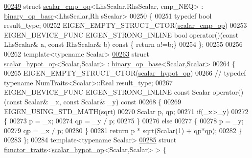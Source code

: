\begin{DoxyCode}
\hyperlink{struct_eigen_1_1internal_1_1scalar__cmp__op_3_01_lhs_scalar_00_01_rhs_scalar_00_01cmp___n_e_q_01_4}{00249} \textcolor{keyword}{struct }\hyperlink{struct_eigen_1_1internal_1_1scalar__cmp__op}{scalar\_cmp\_op}<LhsScalar,RhsScalar, cmp\_NEQ> : \hyperlink{struct_eigen_1_1internal_1_1binary__op__base}{binary\_op\_base}<LhsScalar,Rh
      sScalar>
00250 \{
00251   \textcolor{keyword}{typedef} \textcolor{keywordtype}{bool} result\_type;
00252   EIGEN\_EMPTY\_STRUCT\_CTOR(\hyperlink{struct_eigen_1_1internal_1_1scalar__cmp__op}{scalar\_cmp\_op})
00253   EIGEN\_DEVICE\_FUNC EIGEN\_STRONG\_INLINE \textcolor{keywordtype}{bool} operator()(\textcolor{keyword}{const} LhsScalar& a, \textcolor{keyword}{const} RhsScalar& b)\textcolor{keyword}{ const }\{\textcolor{keywordflow}{
      return} a!=b;\}
00254 \};
00255 
00256 
00262 \textcolor{keyword}{template}<\textcolor{keyword}{typename} Scalar>
\hyperlink{struct_eigen_1_1internal_1_1scalar__hypot__op_3_01_scalar_00_01_scalar_01_4}{00263} \textcolor{keyword}{struct }\hyperlink{struct_eigen_1_1internal_1_1scalar__hypot__op}{scalar\_hypot\_op}<Scalar,Scalar> : \hyperlink{struct_eigen_1_1internal_1_1binary__op__base}{binary\_op\_base}<Scalar,Scalar>
00264 \{
00265   EIGEN\_EMPTY\_STRUCT\_CTOR(\hyperlink{struct_eigen_1_1internal_1_1scalar__hypot__op}{scalar\_hypot\_op})
00266 \textcolor{comment}{//   typedef typename NumTraits<Scalar>::Real result\_type;}
00267   EIGEN\_DEVICE\_FUNC EIGEN\_STRONG\_INLINE \textcolor{keyword}{const} Scalar operator() (\textcolor{keyword}{const} Scalar& \_x, \textcolor{keyword}{const} Scalar& \_y)\textcolor{keyword}{ const}
00268 \textcolor{keyword}{  }\{
00269     EIGEN\_USING\_STD\_MATH(sqrt)
00270     Scalar p, qp;
00271     \textcolor{keywordflow}{if}(\_x>\_y)
00272     \{
00273       p = \_x;
00274       qp = \_y / p;
00275     \}
00276     \textcolor{keywordflow}{else}
00277     \{
00278       p = \_y;
00279       qp = \_x / p;
00280     \}
00281     \textcolor{keywordflow}{return} p * sqrt(Scalar(1) + qp*qp);
00282   \}
00283 \};
00284 \textcolor{keyword}{template}<\textcolor{keyword}{typename} Scalar>
\hyperlink{struct_eigen_1_1internal_1_1functor__traits_3_01scalar__hypot__op_3_01_scalar_00_01_scalar_01_4_01_4}{00285} \textcolor{keyword}{struct }\hyperlink{struct_eigen_1_1internal_1_1functor__traits}{functor\_traits}<\hyperlink{struct_eigen_1_1internal_1_1scalar__hypot__op}{scalar\_hypot\_op}<Scalar,Scalar> > \{

\end{DoxyCode}
